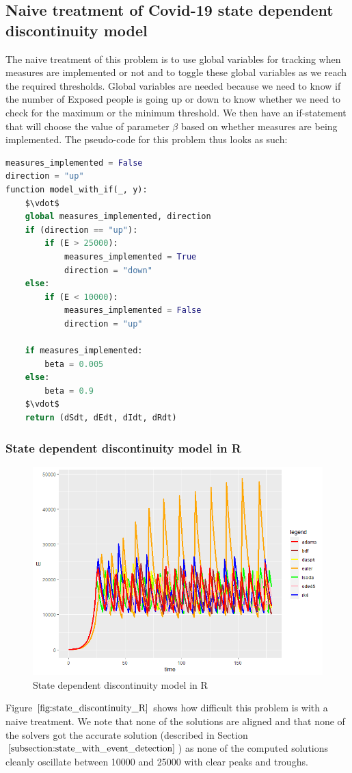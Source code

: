 \subsection{Naive treatment of Covid-19 state dependent discontinuity model}
\label{subsection:naive_state_problem}
The naive treatment of this problem is to use global variables for tracking when measures are implemented or not and to toggle these global variables as we reach the required thresholds. Global variables are needed because we need to know if the number of Exposed people is going up or down to know whether we need to check for the maximum or the minimum threshold. We then have an if-statement that will choose the value of parameter $\beta$ based on whether measures are being implemented. The pseudo-code for this problem thus looks as such:

\begin{minipage}{\linewidth}
\begin{lstlisting}[language=Python]
measures_implemented = False
direction = "up"
function model_with_if(_, y):
    $\vdot$
    global measures_implemented, direction
    if (direction == "up"):
        if (E > 25000):
            measures_implemented = True
            direction = "down"
    else:
        if (E < 10000):
            measures_implemented = False
            direction = "up"

    if measures_implemented:
        beta = 0.005 
    else:
        beta = 0.9
    $\vdot$
    return (dSdt, dEdt, dIdt, dRdt)
\end{lstlisting}
\end{minipage}

\subsubsection{State dependent discontinuity model in R}
\begin{figure}[h]
\centering
\includegraphics[width=0.7\linewidth]{./figures/state_discontinuity_R}
\caption{State dependent discontinuity model in R}
\label{fig:state_discontinuity_R}
\end{figure}
Figure $\ref{fig:state_discontinuity_R}$ shows how difficult this problem is with a naive treatment. We note that none of the solutions are aligned and that none of the solvers got the accurate solution (described in Section $\ref{subsection:state_with_event_detection}$) as none of the computed solutions cleanly oscillate between 10000 and 25000 with clear peaks and troughs.

